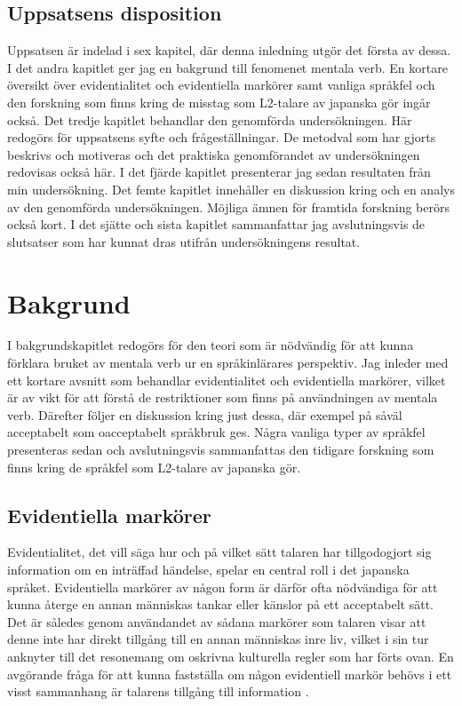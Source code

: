 \documentclass[12pt,a4paper]{article}
\begin{document}
\subsection{Uppsatsens disposition}
\label{sec:Inledning: Uppsatsens disposition}
Uppsatsen är indelad i sex kapitel, där denna inledning utgör det första av dessa. I det andra kapitlet ger jag en bakgrund till fenomenet mentala verb. En kortare översikt över evidentialitet och evidentiella markörer samt vanliga språkfel och den forskning som finns kring de misstag som L2-talare av japanska gör ingår också. Det tredje kapitlet behandlar den genomförda undersökningen. Här redogörs för uppsatsens syfte och frågeställningar. De metodval som har gjorts beskrivs och motiveras och det praktiska genomförandet av undersökningen redovisas också här. I det fjärde kapitlet presenterar jag sedan resultaten från min undersökning. Det femte kapitlet innehåller en diskussion kring och en analys av den genomförda undersökningen. Möjliga ämnen för framtida forskning berörs också kort. I det sjätte och sista kapitlet sammanfattar jag avslutningsvis de slutsatser som har kunnat dras utifrån undersökningens resultat.




\newpage
\section{Bakgrund}
\label{ch:Bakgrund}
I bakgrundskapitlet redogörs för den teori som är nödvändig för att kunna förklara bruket av mentala verb ur en språkinlärares perspektiv. Jag inleder med ett kortare avsnitt som behandlar evidentialitet och evidentiella markörer, vilket är av vikt för att förstå de restriktioner som finns på användningen av mentala verb. Därefter följer en diskussion kring just dessa, där exempel på såväl acceptabelt som oacceptabelt språkbruk ges. Några vanliga typer av språkfel presenteras sedan och avslutningsvis sammanfattas den tidigare forskning som finns kring de språkfel som L2-talare av japanska gör.

\subsection{Evidentiella markörer}
\label{sec:Bakgrund: Evidentiella markörer}
Evidentialitet, det vill säga hur och på vilket sätt talaren har tillgodogjort sig information om en inträffad händelse, spelar en central roll i det japanska språket. Evidentiella markörer av någon form är därför ofta nödvändiga för att kunna återge en annan människas tankar eller känslor på ett acceptabelt sätt. Det är således genom användandet av sådana markörer som talaren visar att denne inte har direkt tillgång till en annan människas inre liv, vilket i sin tur anknyter till det resonemang om oskrivna kulturella regler som har förts ovan. En avgörande fråga för att kunna fastställa om någon evidentiell markör behövs i ett visst sammanhang är talarens tillgång till information \autocite{kuno1973,shibatani1990}.
\end{document}

